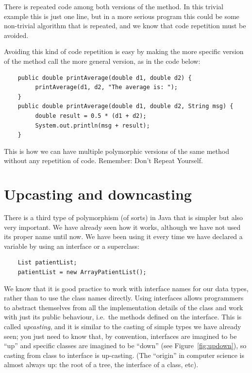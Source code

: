 There is repeated code among both versions of the method. In this
trivial example this is just one line, but in a more serious program
this could be some non-trivial algorithm that is repeated, and we know
that code repetition must be avoided. 

Avoiding this kind of code repetition is easy by making the more
specific version of the method call the more general version, as in
the code below: 

\begin{verbatim}
    public double printAverage(double d1, double d2) {
         printAverage(d1, d2, "The average is: ");
    }
    public double printAverage(double d1, double d2, String msg) {
         double result = 0.5 * (d1 + d2);
         System.out.println(msg + result);
    }
\end{verbatim}

This is how we can have multiple polymorphic versions of the same
method without any repetition of code. Remember: Don't Repeat
Yourself. 

\section{Upcasting and downcasting}
\label{sec:upcasting}

There is a third type of
polymorphism (of sorts) in Java that is simpler but also very
important. 
We have
already seen how it works, although we have not used its proper name
until now.
We have been using it every time we have declared
a variable by using an interface or a superclass: 

\begin{verbatim}
    List patientList;
    patientList = new ArrayPatientList();
\end{verbatim}

We know that it is good practice to work with interface names for our
data types, rather than to use the class names directly. Using interfaces
allows programmers to abstract themselves from all the implementation details
of the class and work with just its public behaviour, i.e.~the methods
defined on the interface. This is called \emph{upcasting}, and it is similar to the
casting of simple types we have already seen; you just need to know
that, by convention, interfaces are imagined to be ``up'' and specific
classes are imagined to be ``down'' (see Figure~\ref{fig:updown}), so casting from class to
interface is up-casting. (The ``origin'' in computer science is almost
always up: the root of a tree, the interface of a class, etc). 

